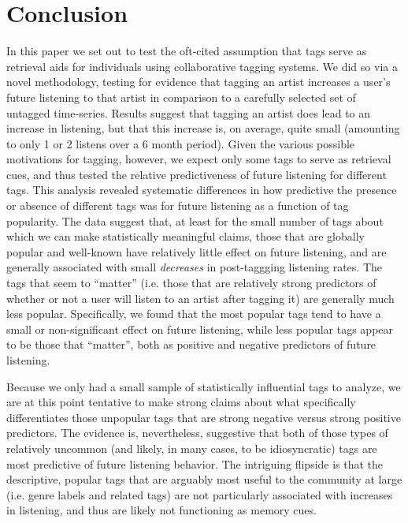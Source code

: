\section{Conclusion}
\label{sec_conclusion}
In this paper we set out to test the oft-cited assumption that tags serve as retrieval aids for individuals using collaborative tagging systems.  We did so via a novel methodology, testing for evidence that tagging an artist increases a user's future listening to that artist in comparison to a carefully selected set of untagged time-series. Results suggest that tagging an artist does lead to an increase in listening, but that this increase is, on average, quite small (amounting to only 1 or 2 listens over a 6 month period). Given the various possible motivations for tagging, however, we expect only some tags to serve as retrieval cues, and thus tested the relative predictiveness of future listening for different tags. This analysis revealed systematic differences in how predictive the presence or absence of different tags was for future listening as a function of tag popularity. The data suggest that, at least for the small number of tags about which we can make statistically meaningful claims, those that are globally popular and well-known have relatively little effect on future listening, and are generally associated with small \emph{decreases} in post-taggging listening rates. The tags that seem to ``matter'' (i.e. those that are relatively strong predictors of whether or not a user will listen to an artist after tagging it) are generally much less popular. Specifically, we found that the most popular tags tend to have a small or non-significant effect on future listening, while less popular tags appear to be those that ``matter'', both as positive and negative predictors of future listening.

Because we only had a small sample of statistically influential tags to analyze, we are at this point tentative to make strong claims about what specifically differentiates those unpopular tags that are strong negative versus strong positive predictors. The evidence is, nevertheless, suggestive that both of those types of relatively uncommon (and likely, in many cases, to be idiosyncratic) tags are most predictive of future listening behavior. The intriguing flipside is that the descriptive, popular tags that are arguably most useful to the community at large (i.e. genre labels and related tags) are not particularly associated with increases in listening, and thus are likely not functioning as memory cues.

